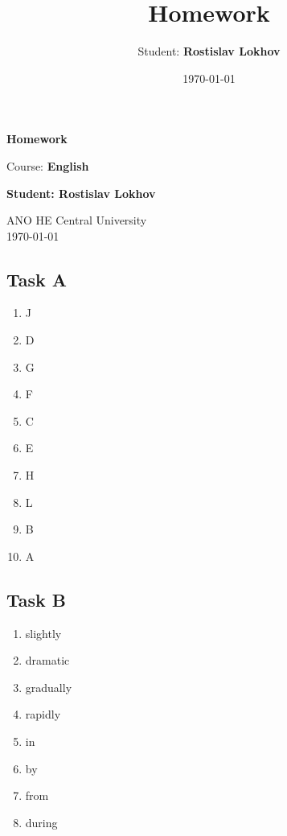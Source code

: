\documentclass[a4paper,12pt,english]{article}
\title{Homework}
\author{Student: \textbf{Rostislav Lokhov}}
\date{\today}
\begin{document}
\begin{titlepage}
    \centering
    \vspace*{1cm}

    \Huge
    \textbf{Homework}

    \vspace{0.5cm}
    \LARGE
    Course: \textbf{English}

    \vspace{1.5cm}

    \textbf{Student: Rostislav Lokhov}

    \vfill

    \Large
    ANO HE Central University\\
    \vspace{0.3cm}
    \today

\end{titlepage}


\subsection{Task A}
\begin{enumerate}
    \item J
    \item D
    \item G
    \item F
    \item C
    \item E
    \item H
    \item L
    \item B
    \item A
\end{enumerate}

\subsection{Task B}

\begin{enumerate}
    \item slightly
    \item dramatic
    \item gradually
    \item rapidly
    \item in
    \item by
    \item from
    \item during
\end{enumerate}
\end{document}

